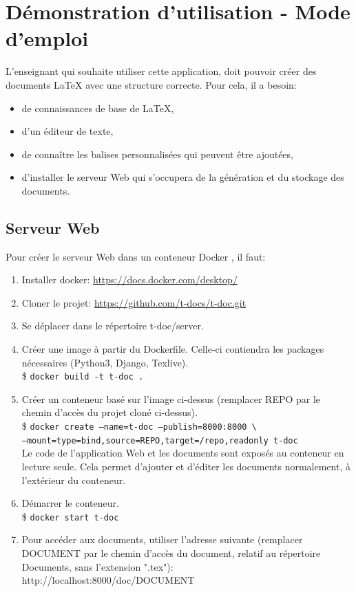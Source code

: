 \documentclass[12pt,titlepage,oneside]{article}
\renewcommand{\cite}[1]{}
\begin{document}
\newpage

\section{Démonstration d'utilisation - Mode d'emploi}
L'enseignant qui souhaite utiliser cette application, doit pouvoir créer des documents LaTeX avec une structure correcte. Pour cela, il a besoin:
\begin{itemize}
\item de connaissances de base de LaTeX,
\item d'un éditeur de texte,
\item de connaître les balises personnalisées qui peuvent être ajoutées,
\item d'installer le serveur Web qui s'occupera de la génération et du stockage des documents.
\end{itemize}

\subsection{Serveur Web}
Pour créer le serveur Web dans un conteneur Docker \cite{docker}, il faut:
\begin{enumerate}
  \item Installer docker: \url{https://docs.docker.com/desktop/}
  \item Cloner le projet: \url{https://github.com/t-docs/t-doc.git}
  \item Se déplacer dans le répertoire t-doc/server.
  \item Créer une image à partir du Dockerfile. Celle-ci contiendra les packages nécessaires (Python3, Django, Texlive).\\
  \$ \texttt{docker build -t t-doc .}
  \item Créer un conteneur basé sur l'image ci-dessus (remplacer REPO par le chemin d'accès du projet cloné ci-dessus).\\
  \$ \texttt{docker create --name=t-doc --publish=8000:8000 \textbackslash\\
  --mount=type=bind,source=REPO,target=/repo,readonly t-doc}\\
  Le code de l'application Web et les documents sont exposés au conteneur en lecture seule. Cela permet d'ajouter et d'éditer les documents normalement, à l'extérieur du conteneur.
  \item Démarrer le conteneur.\\
  \$ \texttt{docker start t-doc}
  \item Pour accéder aux documents, utiliser l'adresse suivante (remplacer DOCUMENT par le chemin d'accès du document, relatif au répertoire Documents, sans l'extension ".tex"):\\
  http://localhost:8000/doc/DOCUMENT
\end{enumerate}
\end{document}
